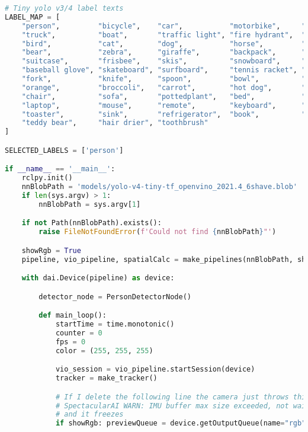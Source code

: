 \begin{lstlisting}[language=python,frame=single]
# Tiny yolo v3/4 label texts
LABEL_MAP = [
    "person",         "bicycle",    "car",           "motorbike",     "aeroplane",   "bus",           "train",
    "truck",          "boat",       "traffic light", "fire hydrant",  "stop sign",   "parking meter", "bench",
    "bird",           "cat",        "dog",           "horse",         "sheep",       "cow",           "elephant",
    "bear",           "zebra",      "giraffe",       "backpack",      "umbrella",    "handbag",       "tie",
    "suitcase",       "frisbee",    "skis",          "snowboard",     "sports ball", "kite",          "baseball bat",
    "baseball glove", "skateboard", "surfboard",     "tennis racket", "bottle",      "wine glass",    "cup",
    "fork",           "knife",      "spoon",         "bowl",          "banana",      "apple",         "sandwich",
    "orange",         "broccoli",   "carrot",        "hot dog",       "pizza",       "donut",         "cake",
    "chair",          "sofa",       "pottedplant",   "bed",           "diningtable", "toilet",        "tvmonitor",
    "laptop",         "mouse",      "remote",        "keyboard",      "cell phone",  "microwave",     "oven",
    "toaster",        "sink",       "refrigerator",  "book",          "clock",       "vase",          "scissors",
    "teddy bear",     "hair drier", "toothbrush"
]

SELECTED_LABELS = ['person']

if __name__ == '__main__':
    rclpy.init()
    nnBlobPath = 'models/yolo-v4-tiny-tf_openvino_2021.4_6shave.blob'
    if len(sys.argv) > 1:
        nnBlobPath = sys.argv[1]

    if not Path(nnBlobPath).exists():
        raise FileNotFoundError(f'Could not find {nnBlobPath}"')

    showRgb = True
    pipeline, vio_pipeline, spatialCalc = make_pipelines(nnBlobPath, showRgb)

    with dai.Device(pipeline) as device:

        detector_node = PersonDetectorNode()

        def main_loop():
            startTime = time.monotonic()
            counter = 0
            fps = 0
            color = (255, 255, 255)

            vio_session = vio_pipeline.startSession(device)
            tracker = make_tracker()

            # If I delete the following line the camera just throws this:
            # SpectacularAI WARN: IMU buffer max size exceeded, not waiting for more frames
            # and it freezes
            if showRgb: previewQueue = device.getOutputQueue(name="rgb", maxSize=4, blocking=False)
            

\end{lstlisting}
